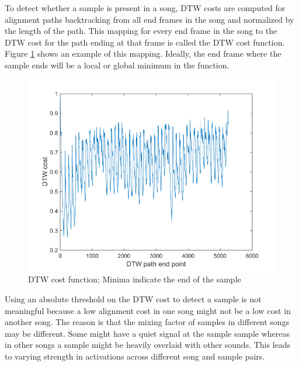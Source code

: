 \documentclass{article}
\begin{document}
To detect whether a sample is present in a song, DTW costs are computed for alignment paths backtracking from all end frames in the song and normalized by the length of the path. This mapping for every end frame in the song to the DTW cost for the path ending at that frame is called the DTW cost function. Figure \ref{fig3} shows an example of this mapping. Ideally, the end frame where the sample ends will be a local or global minimum in the function.

\begin{figure}[h!]
\centering
\includegraphics[width=\linewidth]{DTWcost.png}
\caption{DTW cost function; Minima indicate the end of the sample}
\label{fig3}
\end{figure}




Using an absolute threshold on the DTW cost to detect a sample is not meaningful because a low alignment cost in one song might not be a low cost in another song. The reason is that the mixing factor of samples in different songs may be different. Some might have a quiet signal at the sample sample whereas in other songs a sample might be heavily overlaid with other sounds. This leads to varying strength in activations across different song and sample pairs. 
\end{document}
